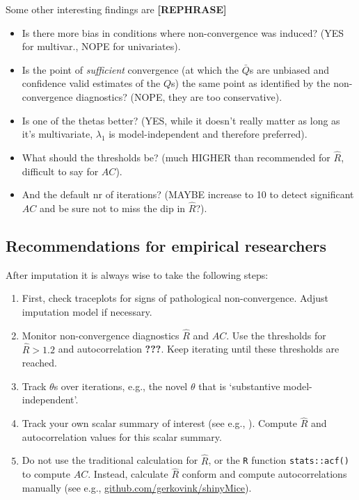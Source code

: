 \documentclass[Royal,times,sageh]{sagej}
\begin{document}
Some other interesting findings are \textbf{{[}REPHRASE{]}}

\begin{itemize}
\item
  Is there more bias in conditions where non-convergence was induced? (YES for multivar., NOPE for univariates).
\item
  Is the point of \emph{sufficient} convergence (at which the \(\bar{Q}\)s are unbiased and confidence valid estimates of the \(Q\)s) the same point as identified by the non-convergence diagnostics? (NOPE, they are too conservative).
\item
  Is one of the thetas better? (YES, while it doesn't really matter as long as it's multivariate, \(\lambda_1\) is model-independent and therefore preferred).
\item
  What should the thresholds be? (much HIGHER than recommended for \(\widehat{R}\), difficult to say for \(AC\)).
\item
  And the default nr of iterations? (MAYBE increase to 10 to detect significant \(AC\) and be sure not to miss the dip in \(\widehat{R}\)?).
\end{itemize}

\hypertarget{recommendations-for-empirical-researchers}{%
\subsection{Recommendations for empirical researchers}\label{recommendations-for-empirical-researchers}}

After imputation it is always wise to take the following steps:

\begin{enumerate}
\def\labelenumi{\arabic{enumi}.}
\item
  First, check traceplots for signs of pathological non-convergence. Adjust imputation model if necessary.
\item
  Monitor non-convergence diagnostics \(\widehat{R}\) and \(AC\). Use the thresholds for \(\widehat{R}>1.2\) and autocorrelation \textbf{???}. Keep iterating until these thresholds are reached.
\item
  Track \(\theta\)s over iterations, e.g., the novel \(\theta\) that is `substantive model-independent'.
\item
  Track your own scalar summary of interest (see e.g., \citet{buur18}). Compute \(\widehat{R}\) and autocorrelation values for this scalar summary.
\item
  Do not use the traditional calculation for \(\widehat{R}\), or the \texttt{R} function \texttt{stats::acf()} to compute \(AC\). Instead, calculate \(\widehat{R}\) conform \citet{veht19} and compute autocorrelations manually (see e.g., \href{https://github.com/gerkovink/shinyMice/tree/master/3.Thesis/1.SimulationStudy}{github.com/gerkovink/shinyMice}).
\end{enumerate}
\end{document}

